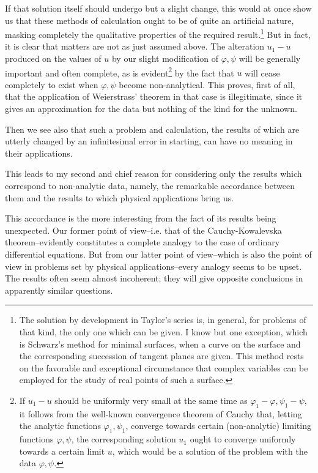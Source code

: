 \documentclass[12pt,oneside]{book}
\begin{document}
If that solution itself should undergo but a slight change, this would at once
show us that these methods of calculation ought to be of quite an artificial
nature, masking completely the qualitative properties of the required
result.\footnote{The solution by development in Taylor's series is, in general,
for problems of that kind, the only one which can be given. I know but one
exception, which is Schwarz's method for minimal surfaces, when a curve on the
surface and the corresponding succession of tangent planes are given. This
method rests on the favorable and exceptional circumstance that complex
variables can be employed for the study of real points of such a surface.} But
in fact, it is clear that matters are not as just assumed above. The alteration
$u_1-u$ produced on the values of $u$ by our slight modification of
$\varphi,\psi$ will be generally important and often complete, as is
evident\footnote{If $u_1-u$ should be uniformly very small at the same time as
$\varphi_1-\varphi,\psi_1-\psi$, it follows from the well-known convergence
theorem of Cauchy that, letting the analytic functions $\varphi_1,\psi_1$,
converge towards certain (non-analytic) limiting functions $\varphi,\psi$, the
corresponding solution $u_1$ ought to converge uniformly towards a certain limit
$u$, which would be a solution of the problem with the data $\varphi,\psi$.} by
the fact that $u$ will cease completely to exist when $\varphi,\psi$ become
non-analytical. This proves, first of all, that the application of Weierstrass'
theorem in that case is illegitimate, since it gives an approximation for the
data but nothing of the kind for the unknown. \par

Then we see also that such a problem and calculation, the results of which are
utterly changed by an infinitesimal error in starting, can have no meaning in
their applications. \par

This leads to my second and chief reason for considering only the results which
correspond to non-analytic data, namely, the remarkable accordance between them
and the results to which physical applications bring us. \par

This accordance is the more interesting from the fact of its results being
unexpected. Our former point of view--i.e. that of the Cauchy-Kowalevska
theorem--evidently constitutes a complete analogy to the case of ordinary
differential equations. But from our latter point of view--which is also the
point of view in problems set by physical applications--every analogy seems to
be upset. The results often seem almost incoherent; they will give opposite
conclusions in apparently similar questions. \par
\end{document}
